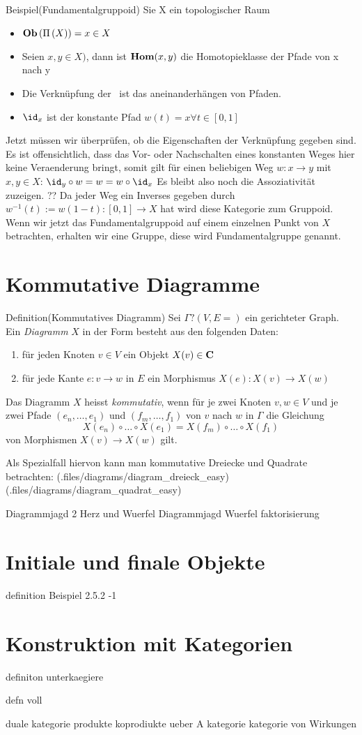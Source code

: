 \documentclass{article}
\begin{document}
		 
		 Beispiel(Fundamentalgruppoid)\cite[ Aufgabe 2.24 ]{Bra}
		 Sie X ein topologischer Raum
		\begin{itemize}
			\item \( \mathbf{Ob}  \left( \Pi \left( X \right) \right) = x \in X \)
			 \item Seien \( x ,y \in X ) \), dann ist \(  \mathbf{Hom } (x,y) \) die Homotopieklasse der Pfade von x nach y
			 \item Die Verkn\"upfung der \Hom \ ist das aneinanderh\"angen von Pfaden.
			 \item \(  \id_x \) ist der konstante Pfad \( w(t)=x \forall t \in [0,1] \)
		\end{itemize}
		Jetzt m\"ussen wir \"uberpr\"ufen, ob die Eigenschaften der Verkn\"upfung gegeben sind.
		Es ist offensichtlich, dass das Vor- oder Nachschalten eines konstanten Weges hier keine Veraenderung bringt, somit gilt f\"ur einen beliebigen Weg 
		\(w:x \to y \) mit \( x,y \in X\):
		\( \id_y \circ w = w = w \circ \id_x \)
		Es bleibt also noch die Assoziativit\"at zuzeigen.
		??
		Da jeder Weg ein Inverses gegeben durch \( w^{-1}(t):=w(1-t): [0,1] \to X \) hat wird diese Kategorie zum Gruppoid.
		Wenn wir jetzt das Fundamentalgruppoid auf einem einzelnen Punkt von \( X \) betrachten, erhalten wir eine Gruppe, diese wird Fundamentalgruppe genannt.
		
	
	\section{Kommutative Diagramme}
		Definition(Kommutatives Diagramm) \cite[Definition 2.4.3]{Bra}
		Sei \(\Gamma? (V,E=) \) ein gerichteter Graph. Ein  \emph{Diagramm} $X$ in der Form \Gamma besteht aus den folgenden Daten:
		\begin{enumerate}
			\item f\"ur jeden Knoten \( v \in V \) ein  Objekt \( X(v) \in \mathbf{C} \)
			\item f\"ur jede Kante \( e:v \to w \) in \( E \) ein Morphismus \( X(e):X(v) \to X(w) \)  
		\end{enumerate}
		Das Diagramm $X$ heisst \emph{kommutativ}, wenn f\"ur je zwei Knoten \(v,w \in V \) und je zwei Pfade \( \left(e_n, \dots ,e_1\right) \) und \( \left(f_m, \dots ,f_1\right) \) von $v $ nach $w$ in $\Gamma $ die Gleichung 
		\[
			X(e_n) \circ \dots \circ X(e_1) = X(f_m) \circ \dots \circ X(f_1)
		\]
		von Morphismen \( X(v) \to X(w) \) gilt.
		
		Als Spezialfall hiervon kann man kommutative Dreiecke und Quadrate betrachten:
		(.files/diagrams/diagram_dreieck_easy)
		(.files/diagrams/diagram_quadrat_easy)		 

Diagrammjagd 2
Herz und Wuerfel
Diagrammjagd Wuerfel
faktorisierung


\section{Initiale und finale Objekte}
definition
Beispiel 2.5.2 -1

\section{Konstruktion mit Kategorien}
definiton unterkaegiere

defn voll

duale kategorie 
produkte
koprodiukte
ueber A kategorie
kategorie von Wirkungen
\end{document}
